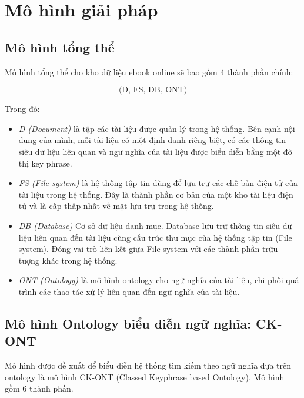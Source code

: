 \chapter{Mô hình giải pháp}

\section{Mô hình tổng thể}

Mô hình tổng thể cho kho dữ liệu ebook online sẽ bao gồm 4 thành phần chính:

\begin{equation}
    \text{(D, FS, DB, ONT)}
\end{equation}

Trong đó:

\begin{itemize}
    \item \textit{D (Document)} là tập các tài liệu được quản lý trong hệ thống. Bên cạnh nội dung của mình, mỗi tài liệu có một định danh riêng biệt, có các thông tin siêu dữ liệu liên quan và ngữ nghĩa của tài liệu được biểu diễn bằng một đô thị key phrase. 
    \item \textit{FS (File system)} là hệ thống tập tin dùng để lưu trữ các chế bản điện tử của
tài liệu trong hệ thống. Đây là thành phần cơ bản của một kho tài liệu điện tử và là cấp thấp nhất về mặt lưu trữ trong hệ thống.

    \item \textit{DB (Database)} Cơ sở dữ liệu danh mục. Database lưu trữ thông tin siêu dữ liệu liên quan đến tài liệu cùng cấu trúc thư mục của hệ thống tập tin (File system). Đóng vai trò liên kết giữa File system với các thành phần trừu tượng khác trong hệ thống.
    
    \item \textit{ONT (Ontology)} là mô hình ontology cho ngữ nghĩa của tài liệu, chi phối quá
trình các thao tác xử lý liên quan đến ngữ nghĩa của tài liệu.
\end{itemize}



\section{Mô hình Ontology biểu diễn ngữ nghĩa: CK-ONT}

Mô hình được đề xuất để biểu diễn hệ thống tìm kiếm theo ngữ nghĩa dựa trên ontology là mô hình CK-ONT (Classed Keyphrase based Ontology). Mô hình gồm 6 thành phần. 

